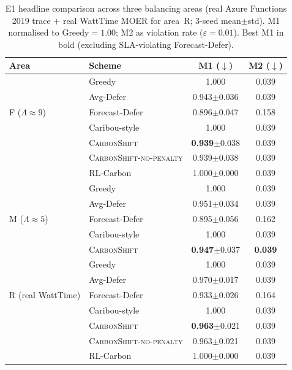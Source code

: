 \begin{table}[tb]
\centering
\caption{E1 headline comparison across three balancing areas (real Azure
Functions 2019 trace + real WattTime MOER for area~R; 3-seed
mean$\pm$std). M1 normalised to Greedy$=1.00$; M2 as violation rate
($\varepsilon=0.01$). Best M1 in bold (excluding SLA-violating
Forecast-Defer).}
\label{tab:e1}
\small
\setlength{\tabcolsep}{4pt}
\begin{tabular}{@{}llcc@{}}
\toprule
Area & Scheme & M1 ($\downarrow$) & M2 ($\downarrow$) \\
\midrule
\multirow{5}{*}{F ($\Lambda\!\approx\!9$)}
  & Greedy           & 1.000 & 0.039 \\
  & Avg-Defer        & 0.943$\pm$0.036 & 0.039 \\
  & Forecast-Defer   & 0.896$\pm$0.047 & 0.158 \\
  & Caribou-style    & 1.000 & 0.039 \\
  & \textsc{CarbonShift} & \textbf{0.939}$\pm$0.038 & 0.039 \\
  & \textsc{CarbonShift-no-penalty} & 0.939$\pm$0.038 & 0.039 \\
  & RL-Carbon             & 1.000$\pm$0.000 & 0.039 \\
\midrule
\multirow{5}{*}{M ($\Lambda\!\approx\!5$)}
  & Greedy           & 1.000 & 0.039 \\
  & Avg-Defer        & 0.951$\pm$0.034 & 0.039 \\
  & Forecast-Defer   & 0.895$\pm$0.056 & 0.162 \\
  & Caribou-style    & 1.000 & 0.039 \\
  & \textsc{CarbonShift} & \textbf{0.947}$\pm$0.037 & \textbf{0.039} \\
\midrule
\multirow{5}{*}{R (real WattTime)}
  & Greedy           & 1.000 & 0.039 \\
  & Avg-Defer        & 0.970$\pm$0.017 & 0.039 \\
  & Forecast-Defer   & 0.933$\pm$0.026 & 0.164 \\
  & Caribou-style    & 1.000 & 0.039 \\
  & \textsc{CarbonShift} & \textbf{0.963}$\pm$0.021 & 0.039 \\
  & \textsc{CarbonShift-no-penalty} & 0.963$\pm$0.021 & 0.039 \\
  & RL-Carbon             & 1.000$\pm$0.000 & 0.039 \\
\bottomrule
\end{tabular}
\end{table}

